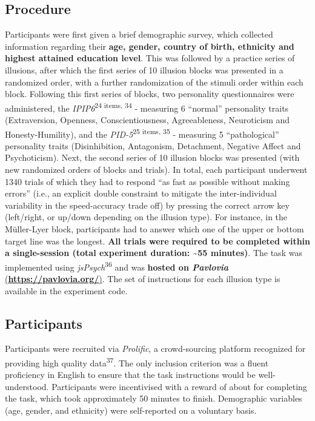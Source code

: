 \documentclass[
  man,floatsintext]{apa6}
\begin{document}
\hypertarget{procedure}{%
\subsection{Procedure}\label{procedure}}

Participants were first given a brief demographic survey, which collected information regarding their \textbf{age, gender, country of birth, ethnicity and highest attained education level}. This was followed by a practice series of illusions, after which the first series of 10 illusion blocks was presented in a randomized order, with a further randomization of the stimuli order within each block. Following this first series of blocks, two personality questionnaires were administered, the \emph{IPIP6}\textsuperscript{24 items, 34} - measuring 6 ``normal'' personality traits (Extraversion, Openness, Conscientiousness, Agreeableness, Neuroticism and Honesty-Humility), and the \emph{PID-5}\textsuperscript{25 items, 35} - measuring 5 ``pathological'' personality traits (Disinhibition, Antagonism, Detachment, Negative Affect and Psychoticism). Next, the second series of 10 illusion blocks was presented (with new randomized orders of blocks and trials). In total, each participant underwent 1340 trials of which they had to respond ``as fast as possible without making errors'' (i.e., an explicit double constraint to mitigate the inter-individual variability in the speed-accuracy trade off) by pressing the correct arrow key (left/right, or up/down depending on the illusion type). For instance, in the Müller-Lyer block, participants had to answer which one of the upper or bottom target line was the longest. \textbf{All trials were required to be completed within a single-session (total experiment duration: \textasciitilde55 minutes)}. The task was implemented using \emph{jsPsych}\textsuperscript{36} and was \textbf{hosted on \emph{Pavlovia} } \href{https://pavlovia.org/}{(\textbf{https://pavlovia.org/})}. The set of instructions for each illusion type is available in the experiment code.

\hypertarget{participants}{%
\subsection{Participants}\label{participants}}

Participants were recruited via \emph{Prolific}, a crowd-sourcing platform recognized for providing high quality data\textsuperscript{37}. The only inclusion criterion was a fluent proficiency in English to ensure that the task instructions would be well-understood. Participants were incentivised with a reward of about  for completing the task, which took approximately 50 minutes to finish. Demographic variables (age, gender, and ethnicity) were self-reported on a voluntary basis.
\end{document}
